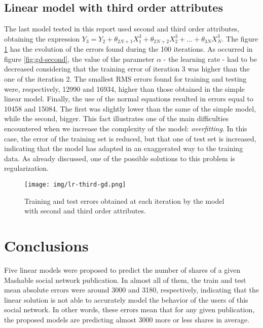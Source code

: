 \documentclass[10pt,twocolumn,letterpaper]{article}
\begin{document}
\subsection{Linear model with third order attributes}

The last model tested in this report used second and third order attributes, obtaining the expression \(Y_3 = Y_2 + \theta_{2N + 1}X_1 ^ 3 + \theta_{2N + 2}X_2 ^ 3 + \ldots + \theta_{3N}X_N^3\). The figure \ref{fig:gd-third} has the evolution of the errors found during the 100 iterations. As occurred in figure \ref{fig:gd-second}, the value of the parameter \(\alpha\) - the learning rate - had to be decreased considering that the training error of iteration 3 was higher than the one of the iteration 2. The smallest RMS errors found for training and testing were, respectively, 12990 and 16934, higher than those obtained in the simple linear model. Finally, the use of the normal equations resulted in errors equal to 10458 and 15084. The first was slightly lower than the same of the simple model, while the second, bigger. This fact illustrates one of the main difficulties encountered when we increase the complexity of the model: \textit{overfitting}. In this case, the error of the training set is reduced, but that one of test set is increased, indicating that the model has adapted in an exaggerated way to the training data. As already discussed, one of the possible solutions to this problem is regularization.

\begin{figure}
    \centering
    \texttt{[image: img/lr-third-gd.png]}
    \caption{Training and test errors obtained at each iteration by the model with second and third order attributes.}
    \label{fig:gd-third}
\end{figure}

\section{Conclusions}

Five linear models were proposed to predict the number of shares of a given Mashable social network publication. In almost all of them, the train and test mean absolute errors were around 3000 and 3180, respectively, indicating that the linear solution is not able to accurately model the behavior of the users of this social network. In other words, these errors mean that for any given publication, the proposed models are predicting almost 3000 more or less shares in average.

{\small


}
\end{document}
